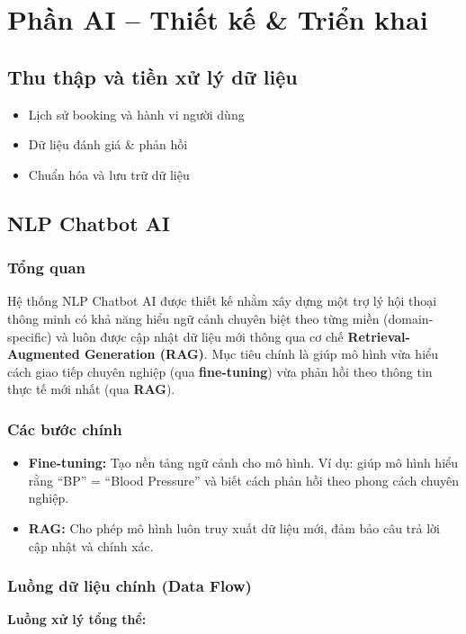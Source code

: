 \section{Phần AI – Thiết kế \& Triển khai}
\subsection{Thu thập và tiền xử lý dữ liệu}
\begin{itemize}
    \item Lịch sử booking và hành vi người dùng
    \item Dữ liệu đánh giá \& phản hồi
    \item Chuẩn hóa và lưu trữ dữ liệu
\end{itemize}
\subsection{NLP Chatbot AI}

\subsubsection{Tổng quan}
Hệ thống NLP Chatbot AI được thiết kế nhằm xây dựng một trợ lý hội thoại thông minh có khả năng hiểu ngữ cảnh chuyên biệt theo từng miền (domain-specific) và luôn được cập nhật dữ liệu mới thông qua cơ chế \textbf{Retrieval-Augmented Generation (RAG)}.  
Mục tiêu chính là giúp mô hình vừa hiểu cách giao tiếp chuyên nghiệp (qua \textbf{fine-tuning}) vừa phản hồi theo thông tin thực tế mới nhất (qua \textbf{RAG}).

\subsubsection{Các bước chính}
\begin{itemize}
    \item \textbf{Fine-tuning:} Tạo nền tảng ngữ cảnh cho mô hình. Ví dụ: giúp mô hình hiểu rằng “BP” = “Blood Pressure” và biết cách phản hồi theo phong cách chuyên nghiệp.
    \item \textbf{RAG:} Cho phép mô hình luôn truy xuất dữ liệu mới, đảm bảo câu trả lời cập nhật và chính xác.
\end{itemize}

\subsubsection{Luồng dữ liệu chính (Data Flow)}

\noindent
\textbf{Luồng xử lý tổng thể:}

